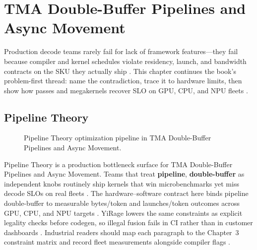 \chapter{TMA Double-Buffer Pipelines and Async Movement}
\label{chap:ch08}

Production decode teams rarely fail for lack of framework features---they fail because compiler and kernel schedules violate residency, launch, and bandwidth contracts on the SKU they actually ship \citep{patel2025llminference,nvidia2022hopper}. This chapter continues the book's problem-first thread: name the contradiction, trace it to hardware limits, then show how passes and megakernels recover SLO on GPU, CPU, and NPU fleets \citep{taxbreak2026,semianalysis2024tma}.

\section{Pipeline Theory}
\label{sec:pipeline_theory}
\begin{figure}[t]
\centering
{}
\caption{Pipeline Theory optimization pipeline in TMA Double-Buffer Pipelines and Async Movement.}
\label{fig:pipeline_theory_pipeline}
\end{figure}


Pipeline Theory is a production bottleneck surface for TMA Double-Buffer Pipelines and Async Movement. Teams that treat \textbf{pipeline}, \textbf{double-buffer} as independent knobs routinely ship kernels that win microbenchmarks yet miss decode SLOs on real fleets \citep{patel2025llminference,nvidia2022hopper}. The hardware--software contract here binds pipeline double-buffer to measurable bytes/token and launches/token outcomes across GPU, CPU, and NPU targets \citep{taxbreak2026,semianalysis2024tma}. YiRage lowers the same constraints as explicit legality checks before codegen, so illegal fusion fails in CI rather than in customer dashboards \citep{memoryfloor2026,amd2024xdna}. Industrial readers should map each paragraph to the Chapter~3 constraint matrix and record fleet measurements alongside compiler flags \citep{nvidia2022hopper,amd2024aie}.

